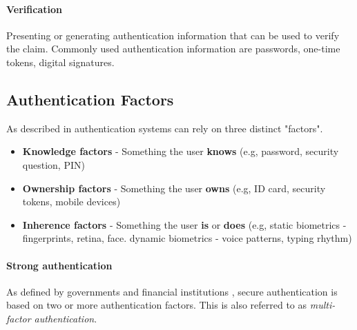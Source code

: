 \paragraph{Verification} Presenting or generating authentication information that can be used to verify the claim.
Commonly used authentication information are passwords, one-time tokens, digital signatures.

\subsection{Authentication Factors}

As described in \cite{council2005authentication} authentication systems can rely on three distinct "factors".

\begin{itemize}
	\item \textbf{Knowledge factors} - Something the user \textbf{knows} (e.g, password, security question, PIN)
	\item \textbf{Ownership factors} - Something the user \textbf{owns} (e.g, ID card, security tokens, mobile devices)
	\item \textbf{Inherence factors} - Something the user \textbf{is} or \textbf{does} (e.g, static biometrics - fingerprints, retina, face. dynamic biometrics - voice patterns, typing rhythm)
\end{itemize}

\paragraph{Strong authentication} As defined by governments and financial institutions \cite{schaeffer2010national, ecb2013recommendations}, secure authentication is based on two or more authentication factors. 
This is also referred to as \textit{multi-factor authentication}.

\newpage